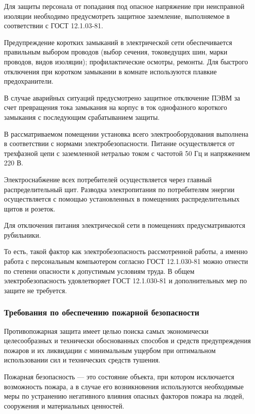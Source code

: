 Для защиты персонала от попадания под опасное напряжение при неисправной изоляции необходимо предусмотреть защитное заземление, выполняемое в соответствии с ГОСТ 12.1.03-81.

Предупреждение коротких замыканий в электрической сети обеспечивается правильным выбором проводов (выбор сечения, токоведущих шин, марки проводов, видов изоляции); профилактические осмотры, ремонты.
Для быстрого отключения при коротком замыкании в комнате используются плавкие предохранители.

В случае аварийных ситуаций предусмотрено защитное отключение ПЭВМ за счет превращения тока замыкания на корпус в ток однофазного короткого замыкания с последующим срабатыванием защиты.

В рассматриваемом помещении установка всего электрооборудования выполнена в соответствии с нормами электробезопасности.
Питание осуществляется от трехфазной цепи с заземленной нетралью током с частотой 50 Гц и напряжением 220 В.

Электроснабжение всех потребителей осуществляется через главный распределительный щит.
Разводка электропитания по потребителям энергии осуществляется с помощью установленных в помещениях распределительных щитов и розеток.

Для отключения питания электрической сети в помещениях предусматриваются рубильники.

То есть, такой фактор как электробезопасность рассмотренной работы, а именно работа с персональным компьютером согласно ГОСТ 12.1.030-81 можно отнести по степени опасности к допустимым условиям труда.
В общем электробезопасность удовлетворяет ГОСТ 12.1.030-81 и дополнительных мер по защите не требуется.

\subsubsection{Требования по обеспечению пожарной безопасности}

Противопожарная защита имеет целью поиска самых экономически целесообразных и технически обоснованных способов и средств предупреждения пожаров и их ликвидации с минимальным ущербом при оптимальном использовании сил и технических средств тушения.

Пожарная безопасность --- это состояние объекта, при котором исключается возможность пожара, а в случае его возникновения используются необходимые меры по устранению негативного влияния опасных факторов пожара на людей, сооружения и материальных ценностей.


